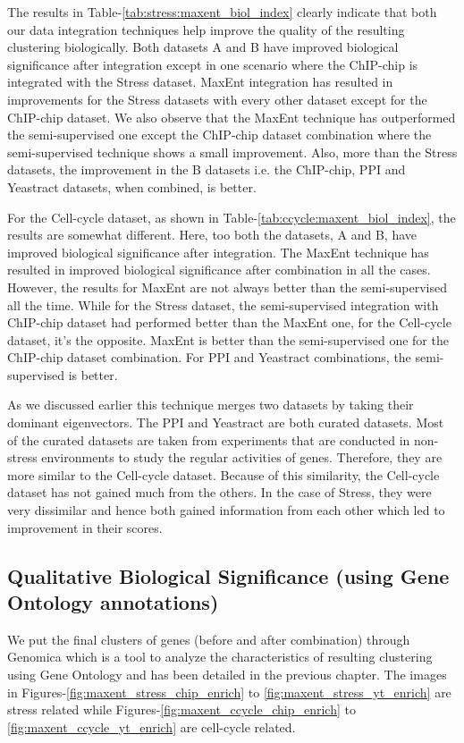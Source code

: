 The results in Table-\ref{tab:stress:maxent_biol_index} clearly indicate that both our data integration techniques 
help improve the quality of the resulting clustering biologically. Both datasets A and B have improved biological significance 
after integration except in one scenario where the ChIP-chip is integrated with the Stress dataset. MaxEnt 
integration has resulted in improvements for the Stress datasets with every other dataset except for the 
ChIP-chip dataset. We also observe that the MaxEnt technique has outperformed 
the semi-supervised one except the ChIP-chip dataset combination where the semi-supervised technique shows a 
small improvement. Also, more than the Stress datasets, the improvement in the B datasets i.e. the ChIP-chip, PPI and Yeastract datasets, when combined, is better. 

For the Cell-cycle dataset, as shown in Table-\ref{tab:ccycle:maxent_biol_index}, the results are somewhat different. Here, too both the datasets, A and B, have improved biological 
significance after integration. The MaxEnt technique has resulted in improved biological significance
after combination in all the cases. However, the results for MaxEnt are not always better than the semi-supervised all the time. 
While for the Stress dataset,  the semi-supervised integration with ChIP-chip dataset had performed 
better than the MaxEnt one, for the Cell-cycle dataset, it's the opposite. MaxEnt is better than the semi-supervised one for the ChIP-chip dataset combination. 
For PPI and Yeastract combinations, the semi-supervised is better.
 
As we discussed earlier this technique merges two datasets by taking their dominant eigenvectors. The PPI and Yeastract 
are both curated datasets. Most of the curated datasets are taken from experiments that are conducted in non-stress environments to study the regular activities of genes. 
Therefore, they are more similar to the Cell-cycle dataset. Because of this similarity, the Cell-cycle dataset has not gained much from the others. 
In the case of Stress, they were very dissimilar and hence both gained information from each other which led to improvement in their scores.    

\subsection{Qualitative Biological Significance (using Gene Ontology annotations)} \label{maxent_biosig_go}

We put the final clusters of genes (before and after combination) through Genomica which is a tool to analyze the characteristics of resulting clustering using Gene Ontology and has been detailed in the previous chapter. The images in Figures-\ref{fig:maxent_stress_chip_enrich} to \ref{fig:maxent_stress_yt_enrich} are stress related while Figures-\ref{fig:maxent_ccycle_chip_enrich} to \ref{fig:maxent_ccycle_yt_enrich} are cell-cycle related.
 
